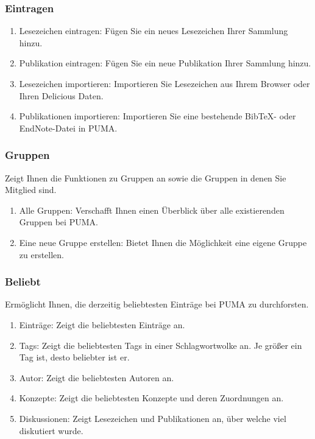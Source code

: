 \subsubsection{Eintragen}
\begin{enumerate}
    \item Lesezeichen eintragen: Fügen Sie ein neues Lesezeichen Ihrer Sammlung hinzu.  
    \item Publikation eintragen: Fügen Sie ein neue Publikation Ihrer Sammlung hinzu. 
    \item Lesezeichen importieren: Importieren Sie Lesezeichen aus Ihrem Browser oder Ihren Delicious Daten.
    \item Publikationen importieren: Importieren Sie eine bestehende BibTeX- oder EndNote-Datei in PUMA.
\end{enumerate}


\subsubsection{Gruppen}
Zeigt Ihnen die Funktionen zu Gruppen an sowie die Gruppen in denen Sie Mitglied sind.
\begin{enumerate}
    \item Alle Gruppen: Verschafft Ihnen einen Überblick über alle existierenden Gruppen bei PUMA.
    \item Eine neue Gruppe erstellen: Bietet Ihnen die Möglichkeit eine eigene Gruppe zu erstellen.
\end{enumerate}
\subsubsection{Beliebt}
Ermöglicht Ihnen, die derzeitig beliebtesten Einträge bei PUMA zu durchforsten.
\begin{enumerate}
    \item Einträge: Zeigt die beliebtesten Einträge an.
    \item Tags: Zeigt die beliebtesten Tags in einer Schlagwortwolke an. Je größer ein Tag ist, desto beliebter ist er.
    \item Autor: Zeigt die beliebtesten Autoren an.
    \item Konzepte: Zeigt die beliebtesten Konzepte und deren Zuordnungen an. 
    \item Diskussionen: Zeigt Lesezeichen und Publikationen an, über welche viel diskutiert wurde. 
\end{enumerate}
